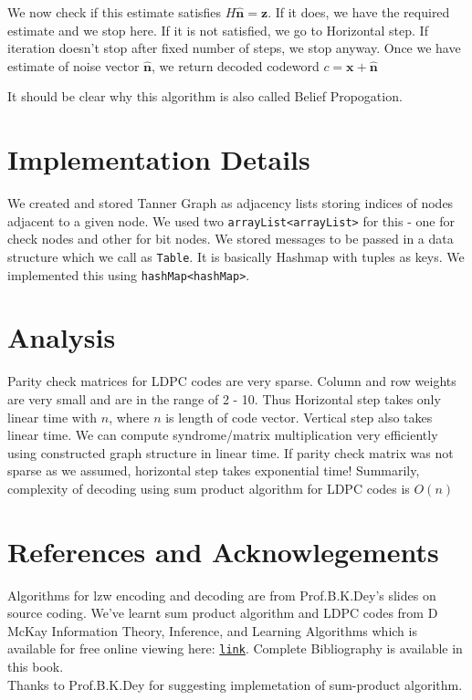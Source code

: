 \documentclass[a4paper]{article}
\begin{document}
We now check if this estimate satisfies $H\mathbf{\hat{n}} = \mathbf{z}$. If it does, we have the required estimate and we stop here. If it is not satisfied, we go to Horizontal step. If iteration doesn't stop after fixed number of steps, we stop anyway. Once we have estimate of noise vector $\mathbf{\hat{n}}$, we return decoded codeword $c = \mathbf{x}+ \mathbf{\hat{n}}$

It should be clear why this algorithm is also called Belief Propogation.

\section{Implementation Details}
We created and stored Tanner Graph as adjacency lists storing indices of nodes adjacent to a given node. We used two \texttt{arrayList<arrayList>} for this - one for check nodes and other for bit nodes. We stored messages to be passed in a data structure which we call as \texttt{Table}. It is basically Hashmap with tuples as keys. We implemented this using \texttt{hashMap<hashMap>}.

\section{Analysis}
Parity check matrices for LDPC codes are very sparse. Column and row weights are very small and are in the range of 2 - 10. Thus Horizontal step takes only linear time with $n$, where $n$ is length of code vector. Vertical step also takes linear time. We can compute syndrome/matrix multiplication very efficiently using constructed graph structure in linear time. 
If parity check matrix was not sparse as we assumed, horizontal step takes exponential time!
Summarily, complexity of decoding using sum product algorithm for LDPC codes is $O(n)$

\section{References and Acknowlegements}
Algorithms for lzw encoding and decoding are from Prof.B.K.Dey's slides on source coding. We've learnt sum product algorithm and LDPC codes from D McKay Information Theory, Inference, and Learning Algorithms which is available for free online viewing here: \texttt{\href{http://www.inference.phy.cam.ac.uk/itprnn/book.pdf}{link}}. Complete Bibliography is available in this book.
\\Thanks to Prof.B.K.Dey for suggesting implemetation of sum-product algorithm.
\end{document}
